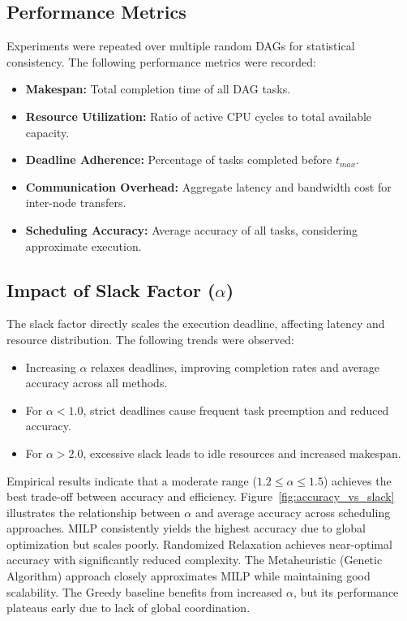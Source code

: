 \documentclass[conference]{IEEEtran}
\begin{document}
\subsection{Performance Metrics}

Experiments were repeated over multiple random DAGs for statistical consistency. The following performance metrics were recorded:
\begin{itemize}
    \item \textbf{Makespan:} Total completion time of all DAG tasks.
    \item \textbf{Resource Utilization:} Ratio of active CPU cycles to total available capacity.
    \item \textbf{Deadline Adherence:} Percentage of tasks completed before $t_{max}$.
    \item \textbf{Communication Overhead:} Aggregate latency and bandwidth cost for inter-node transfers.
    \item \textbf{Scheduling Accuracy:} Average accuracy of all tasks, considering approximate execution.
\end{itemize}

\subsection{Impact of Slack Factor ($\alpha$)}

The slack factor directly scales the execution deadline, affecting latency and resource distribution. The following trends were observed:
\begin{itemize}
    \item Increasing $\alpha$ relaxes deadlines, improving completion rates and average accuracy across all methods.
    \item For $\alpha < 1.0$, strict deadlines cause frequent task preemption and reduced accuracy.
    \item For $\alpha > 2.0$, excessive slack leads to idle resources and increased makespan.
\end{itemize}

Empirical results indicate that a moderate range ($1.2 \le \alpha \le 1.5$) achieves the best trade-off between accuracy and efficiency. Figure~\ref{fig:accuracy_vs_slack} illustrates the relationship between $\alpha$ and average accuracy across scheduling approaches. MILP consistently yields the highest accuracy due to global optimization but scales poorly. Randomized Relaxation achieves near-optimal accuracy with significantly reduced complexity. The Metaheuristic (Genetic Algorithm) approach closely approximates MILP while maintaining good scalability. The Greedy baseline benefits from increased $\alpha$, but its performance plateaus early due to lack of global coordination.
\end{document}
